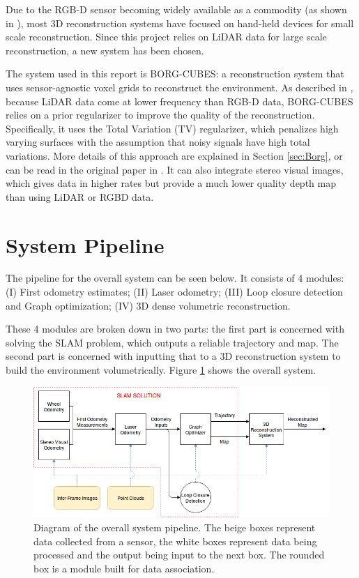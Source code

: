 \documentclass[11pt]{article}
\begin{document}
Due to the RGB-D sensor becoming widely available as a commodity (as shown in \cite{kinectfusion}), most 3D reconstruction systems have focused on hand-held devices for small scale reconstruction. Since this project relies on LiDAR data for large scale reconstruction, a new system has been chosen.	
	
The system used in this report is BORG-CUBES: a reconstruction system that uses sensor-agnostic voxel grids to reconstruct the environment. As described in \cite{TannerFSR2015}, because LiDAR data come at lower frequency than RGB-D data, BORG-CUBES relies on a prior regularizer to improve the quality of the reconstruction. Specifically, it uses the Total Variation (TV) regularizer, which penalizes high varying surfaces with the assumption that noisy signals have high total variations. More details of this approach are explained in Section \ref{sec:Borg}, or can be read in the original paper in \cite{TannerFSR2015}. It can also integrate stereo visual images, which gives data in higher rates but provide a much lower quality depth map than using LiDAR or RGBD data.	

	\newpage
	\section{System Pipeline} 
	\label{pipeline}

The pipeline for the overall system can be seen below. It consists of 4 modules: (I) First odometry estimates; (II) Laser odometry; (III) Loop closure detection and Graph optimization; (IV) 3D dense volumetric reconstruction.

These 4 modules are broken down in two parts: the first part is concerned with solving the SLAM problem, which outputs a reliable trajectory and map. The second part is concerned with inputting that to a 3D reconstruction system to build the environment volumetrically. Figure \ref{fig:SystemPipelineFigure1} shows the overall system.

\begin{figure}[h]
\includegraphics[width=\linewidth]{SystemPipeline}
\caption{Diagram of the overall system pipeline. The beige boxes represent data collected from a sensor, the white boxes represent data being processed and the output being input to the next box. The rounded box is a module built for data association.}
\label{fig:SystemPipelineFigure1}
\end{figure}
	
\end{document}

